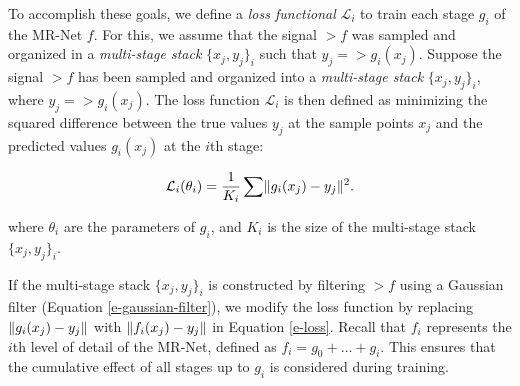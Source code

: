 


To accomplish these goals, we define a \textit{loss functional} $\mathcal{L}_i$ to train each stage $g_i$ of the MR-Net $f$. For this, we assume that the signal $\gt{f}$ was sampled and organized in a \textit{multi-stage stack} $\{x_j, y_j\}_i$ such that $y_j=\gt{g}_i(x_j)$. Suppose the signal $\gt{f}$ has been sampled and organized into a \textit{multi-stage stack} $\{x_j, y_j\}_i$, where $y_j = \gt{g}_i(x_j)$. The loss function $\mathcal{L}_i$ is then defined as minimizing the squared difference between the true values $y_j$ at the sample points $x_j$ and the predicted values $g_i(x_j)$ at the $i$th stage:

\begin{align}\label{e-loss}
    \mathcal{L}_i(\theta_i)=\frac{1}{K_i}\sum \lVert g_i(x_j)-y_j\rVert^2.
\end{align}

where $\theta_i$ are the parameters of $g_i$, and $K_i$ is the size of the multi-stage stack $\{x_j, y_j\}_i$.


If the multi-stage stack $\{x_j, y_j\}_i$ is constructed by filtering $\gt{f}$ using a Gaussian filter (Equation \ref{e-gaussian-filter}), we modify the loss function by replacing $\lVert g_i(x_j) - y_j\rVert$ with $\lVert f_i(x_j) - y_j\rVert$ in Equation \ref{e-loss}. Recall that $f_i$ represents the $i$th level of detail of the MR-Net, defined as $f_i = g_0 + \dots + g_i$. This ensures that the cumulative effect of all stages up to $g_i$ is considered during training.


